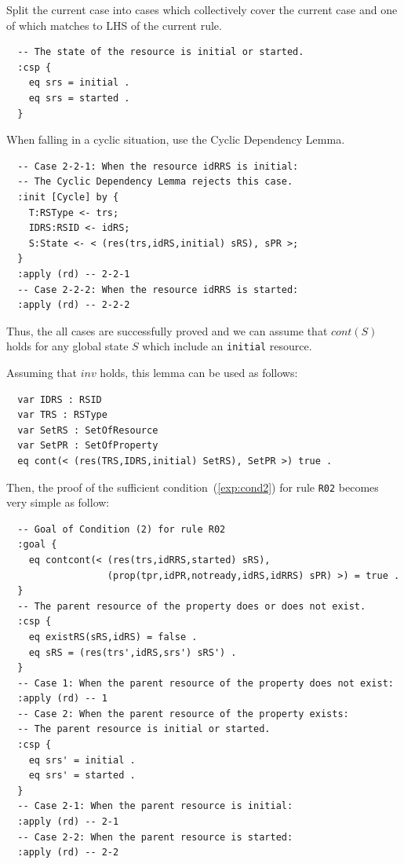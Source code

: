 \documentclass[12pt]{report}
\begin{document}
 Split the current case into cases which
collectively cover the current case and one of which matches to LHS of
the current rule. 
\small
\begin{verbatim}
  -- The state of the resource is initial or started.
  :csp { 
    eq srs = initial .
    eq srs = started .
  }
\end{verbatim}
\normalsize
 When falling in a cyclic situation, use the
Cyclic Dependency Lemma. 
\small
\begin{verbatim}
  -- Case 2-2-1: When the resource idRRS is initial:
  -- The Cyclic Dependency Lemma rejects this case.
  :init [Cycle] by {
    T:RSType <- trs;
    IDRS:RSID <- idRS;
    S:State <- < (res(trs,idRS,initial) sRS), sPR >;
  }
  :apply (rd) -- 2-2-1
  -- Case 2-2-2: When the resource idRRS is started:
  :apply (rd) -- 2-2-2
\end{verbatim}
\normalsize
Thus, the all cases are successfully proved and we can assume that $cont(S)$
holds for any global state $S$ which include an {\tt initial}
resource.

Assuming that $inv$ holds, this lemma can be used as follows:
\small
\begin{verbatim}
  var IDRS : RSID 
  var TRS : RSType
  var SetRS : SetOfResource
  var SetPR : SetOfProperty
  eq cont(< (res(TRS,IDRS,initial) SetRS), SetPR >) true .
\end{verbatim}
\normalsize
Then, the proof of the sufficient condition~(\ref{exp:cond2}) for rule
{\tt R02} becomes very simple as follow:
\small
\begin{verbatim}
  -- Goal of Condition (2) for rule R02
  :goal {
    eq contcont(< (res(trs,idRRS,started) sRS),
                  (prop(tpr,idPR,notready,idRS,idRRS) sPR) >) = true .
  }
  -- The parent resource of the property does or does not exist.
  :csp {
    eq existRS(sRS,idRS) = false .
    eq sRS = (res(trs',idRS,srs') sRS') .
  }
  -- Case 1: When the parent resource of the property does not exist:
  :apply (rd) -- 1
  -- Case 2: When the parent resource of the property exists:
  -- The parent resource is initial or started.
  :csp {
    eq srs' = initial .
    eq srs' = started .
  }
  -- Case 2-1: When the parent resource is initial:
  :apply (rd) -- 2-1
  -- Case 2-2: When the parent resource is started:
  :apply (rd) -- 2-2
\end{verbatim}
\normalsize
\end{document}

